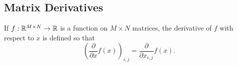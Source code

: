 \documentclass[10pt]{article}
\begin{document}
\subsection{Matrix Derivatives}

If $f:\mathbb{R}^{M \times N} \rightarrow \mathbb{R}$ is a function on $M
\times N$ matrices, the derivative of $f$ with respect to $x$ is
defined so that 
\[
\left( \frac{\partial}{\partial x} f(x) \right)_{i,j}
=
\frac{\partial}{\partial x_{i,j}} f(x).
\]




\clearpage
\nocite{Hogan:2014}
\nocite{Bell:2012}
\nocite{VandevoordeJosuttis:2002}
\nocite{Giles:2008}
\nocite{Gay:2005}
\nocite{GriewankWalther:2008}
\nocite{Fog:2014}
\nocite{Hogan:2014}
\nocite{Neal:2003}



\end{document}
